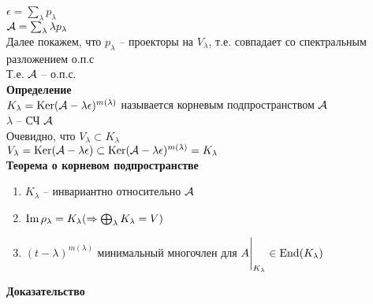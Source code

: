 \documentclass[12pt]{article}
\begin{document}
$\epsilon = \sum_\lambda p_\lambda$\\
$\mathcal{A} = \sum_\lambda \lambda p_\lambda$\\
Далее покажем, что $p_\lambda$ -- проекторы на $V_\lambda$, т.е. совпадает со спектральным разложением о.п.с\\
Т.е. $\mathcal{A}$ -- о.п.с.\\
\textbf{Определение}\\
$K_\lambda = \operatorname{Ker} (\mathcal{A} - \lambda \epsilon)^{m(\lambda)}$ называется корневым подпространством $\mathcal{A}$\\
$\lambda$ -- СЧ $\mathcal{A}$\\
Очевидно, что $V_\lambda \subset K_\lambda$\\
$V_\lambda = \operatorname{Ker} (\mathcal{A} - \lambda \epsilon) \subset \operatorname{Ker} (\mathcal{A} - \lambda \epsilon)^{m(\lambda)} = K_\lambda$\\
\textbf{Теорема о корневом подпространстве}
\begin{enumerate}
    \item $K_\lambda$ -- инвариантно относительно $\mathcal{A}$
    \item $\operatorname{Im} \rho_\lambda = K_\lambda (\Rightarrow \bigoplus_\lambda K_\lambda = V)$
    \item $(t-\lambda)^{m(\lambda)}$ минимальный многочлен для $A\Biggr|_{K_\lambda} \in \operatorname{End}(K_\lambda)$
\end{enumerate}
\textbf{Доказательство}
\end{document}
